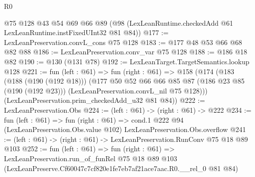\begin{lexlean}{R0}
\begin{coremodule}
    @75
    @128
    @43
    @54
    @69
    @66
    @89
    (@98 (LexLeanRuntime.checkedAdd @61 LexLeanRuntime.instFixedUInt32 @81 @84))
@177 := LexLeanPreservation.convL_cons @75 @128
@183 := @177 @48 @53 @66 @68 @82 @88
@186 := LexLeanPreservation.conv_var @75 @128
@188 := @186 @18 @82
@190 := @130 (@131 @78)
@192 := LexLeanTarget.TargetSemantics.lookup @128
@221 := fun (left : @61) =>
  fun (right : @61) =>
  @158
    (@174
      (@183
        (@188 (@190 (@192 @18)))
        (@177
          @50
          @52
          @66
          @66
          @85
          @87
          (@186 @23 @85 (@190 (@192 @23)))
          (LexLeanPreservation.convL_nil @75 @128)))
      (LexLeanPreservation.prim_checkedAdd_u32 @81 @84))
@222 := LexLeanPreservation.Obs
@224 := (left : @61) -> (right : @61) -> @222
@234 := fun (left : @61) =>
  fun (right : @61) =>
  cond.{1} @222 @94 (LexLeanPreservation.Obs.value @102) LexLeanPreservation.Obs.overflow
@241 := (left : @61) -> (right : @61) -> LexLeanPreservation.RunConv @75 @18 @89 @103
@252 := fun (left : @61) =>
  fun (right : @61) =>
  LexLeanPreservation.run_of_funRel
    @75
    @18
    @89
    @103
    (LexLeanPreserve.Cf60047c7cf820e1fe7eb7af21ace7aac.R0.__rel_0 @81 @84)
\end{coremodule}
\end{lexlean}
